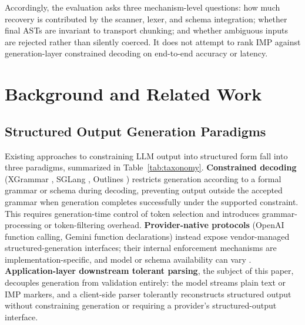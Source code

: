 \documentclass[conference]{IEEEtran}
\begin{document}
Accordingly, the evaluation asks three mechanism-level questions: how much
recovery is contributed by the scanner, lexer, and schema integration; whether
final ASTs are invariant to transport chunking; and whether ambiguous inputs
are rejected rather than silently coerced. It does not attempt to rank IMP
against generation-layer constrained decoding on end-to-end accuracy or latency.

\section{Background and Related Work}

\subsection{Structured Output Generation Paradigms}

Existing approaches to constraining LLM output into structured form fall
into three paradigms, summarized in Table~\ref{tab:taxonomy}.
\textbf{Constrained decoding} (XGrammar \cite{xgrammar}, SGLang
\cite{sglang}, Outlines \cite{outlines}) restricts generation according to
a formal grammar or schema during decoding, preventing output outside the
accepted grammar when generation completes successfully under the supported
constraint. This requires generation-time control of token selection and
introduces grammar-processing or token-filtering overhead.
\textbf{Provider-native protocols} (OpenAI function calling, Gemini function
declarations) instead expose vendor-managed structured-generation interfaces;
their internal enforcement mechanisms are implementation-specific, and model
or schema availability can vary \cite{irai2026}.
\textbf{Application-layer downstream tolerant parsing}, the subject of this paper,
decouples generation from validation entirely: the model streams plain
text or IMP markers, and a client-side parser tolerantly reconstructs
structured output without constraining generation or requiring a provider's
structured-output interface.

\begin{table}[t]
\centering
\caption{Structured-output design space. The approaches prevent or handle
malformation at different pipeline stages and are not interchangeable.}
\label{tab:taxonomy}
\scriptsize
{}
\end{table}
\end{document}
